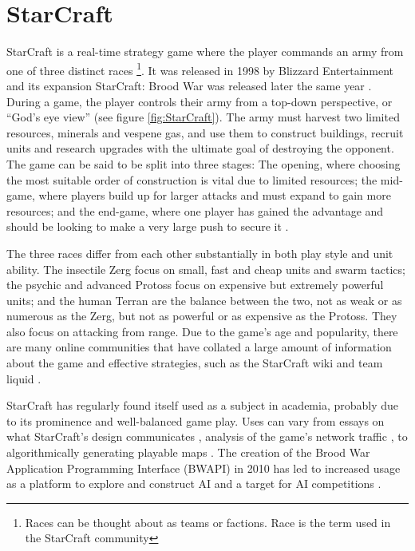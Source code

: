 \documentclass[11pt,openright,a4paper]{report}
\begin{document}
\section{StarCraft}
StarCraft is a real-time strategy game where the player commands an army from one of three distinct races \footnote{Races can be thought about as teams or factions. Race is the term used in the StarCraft community}. It was released in 1998 by Blizzard Entertainment and its expansion StarCraft: Brood War was released later the same year \cite{Blizzard}. During a game, the player controls their army from a top-down perspective, or ``God's eye view'' (see figure \ref{fig:StarCraft}). The army must harvest two limited resources, minerals and vespene gas, and use them to construct buildings, recruit units and research upgrades with the ultimate goal of destroying the opponent. The game can be said to be split into three stages: The opening, where choosing the most suitable order of construction is vital due to limited resources; the mid-game, where players build up for larger attacks and must expand to gain more resources; and the end-game, where one player has gained the advantage and should be looking to make a very large push to secure it \cite{yi2011adaptive}.

The three races differ from each other substantially in both play style and unit ability. The insectile Zerg focus on small, fast and cheap units and swarm tactics; the psychic and advanced Protoss focus on expensive but extremely powerful units; and the human Terran are the balance between the two, not as weak or as numerous as the Zerg, but not as powerful or as expensive as the Protoss. They also focus on attacking from range.  Due to the game's age and popularity, there are many online communities that have collated a large amount of information about the game and effective strategies, such as the StarCraft wiki \cite{SCWiki} and team liquid \cite{TeamLiquid}.

StarCraft has regularly found itself used as a subject in academia, probably due to its prominence and well-balanced game play.  Uses can vary from essays on what StarCraft's design communicates \cite{galloway2007starcraft}, analysis of the game's network traffic \cite{dainotti2005packet} , to algorithmically generating playable maps \cite{togelius2010multiobjective}. The creation of the Brood War Application Programming Interface (BWAPI) in 2010 \cite{bwapiMain} has led to increased usage as a platform to explore and construct AI and a target for AI competitions \cite{bwapiCompetitions}.
\end{document}
